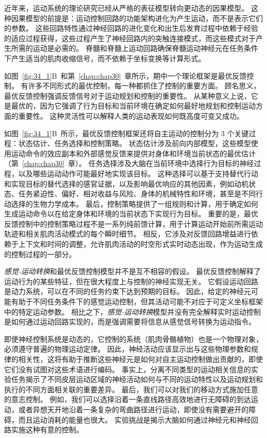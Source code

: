 近年来，运动系统的理论研究已经从严格的表征模型转向更动态的因果模型。
这种因果模型的前提是：运动控制回路的功能架构进化为产生运动，而不是表示它们的参数。
这些回路特性通过神经回路的进化变化和出生后发育过程中依赖于经验的适应过程获得，这些过程产生了神经回路内的突触连接模式，而这些模式对于产生所需的运动是必需的。
脊髓和脊髓上运动回路确保脊髓运动神经元在任务条件下产生适当的肌肉收缩信号，而不依赖于坐标变换等计算形式。


如图~\ref{fig:34_1}B~和第~\ref{chap:chap30}~章所示，期中一个理论框架是最优反馈控制。
有许多不同形式的最优控制，每一种都抓住了控制的重要方面。
顾名思义，最优反馈控制强调反馈信号对于运动规划和控制的重要性。
从某种意义上说，它是最优的，因为它强调了行为目标和当前环境在确定如何最好地规划和控制运动方面的重要性。
这种灵活性可以解释人类的运动表现如何既高度可变又成功。


如图~\ref{fig:34_1}B~所示，最优反馈控制框架还将自主运动的控制分为 3 个关键过程：状态估计、任务选择和控制策略。
状态估计涉及前向内部模型，这些模型使用运动命令的效应副本和外部感觉反馈来提供对身体和环境当前状态的最优估计（第~\ref{chap:chap30}~章）。
任务选择涉及大脑在当前环境中选择行为目标的神经过程，以及哪些运动动作可能最好地实现该目标。
这种选择可以基于支持替代行动和实现目标的替代选择的感官证据，以及影响最优响应的其他因素，例如动机状态、任务紧迫性、偏好、相对收益与风险、身体的机械特性和环境，甚至是不同行动选择的生物力学成本。
最后，控制策略提供了一组规则和计算，用于确定如何生成运动命令以在给定身体和环境的当前状态下实现行为目标。
重要的是，最优反馈控制中的控制策略过程不是一系列纯前馈计算，用于计算运动开始前所需运动轨迹和相关肌肉活动模式的每个瞬时细节。
相反，它涉及对反馈回路增益进行依赖于上下文和时间的调整，允许肌肉活动的时空形式实时动态出现，作为运动生成的控制过程的一部分。


\textit{感觉-运动转换}和最优反馈控制模型并不是互不相容的假设。
最优反馈控制解释了运动行为的某些特征，但在很大程度上与控制的神经实现无关。
它假设运动回路是动力系统，可以在不同的任务约束下达到预期的目标。
因此，给定的神经元可能有助于不同任务条件下的感觉运动控制，但其活动可能不对应于可定义坐标框架中的特定运动参数。
相比之下，\textit{感觉-运动转换}模型并没有完全解释实时运动控制是如何通过运动回路实现的，而是强调需要将信息从感觉信号转换为运动指令。


即使神经控制系统是动态的，它控制的系统（肌肉骨骼植物）也是一个物理对象，必须遵守普遍的物理运动定律。
因此，神经活动应该显示出与这些物理参数和规律的相关性，这将有助于推断这些神经元是如何对自主运动控制做出贡献的，即使它们没有试图对这些术语进行编码。
事实上，分离不同类型的运动相关信息的实验任务揭示了不同皮层运动区域的神经活动如何与不同的运动特性以及运动规划和执行的不同方面相关联的重要差异。
最后，我们可以对我们的移动方式施加任意的意志控制。
例如，我们可以选择沿着一条直线路径高效地进行无障碍的到达运动，或者异想天开地沿着一条复杂的弯曲路径进行运动，即使没有需要避开的障碍，而且运动消耗的能量也很大。
实验挑战是揭示大脑如何通过神经元和神经回路实施这种有意的控制。



